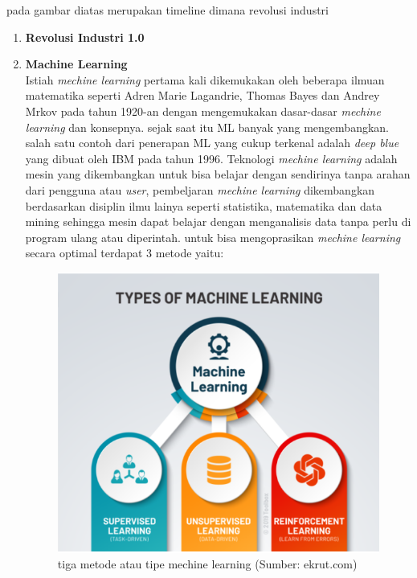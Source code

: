 pada gambar diatas merupakan timeline dimana revolusi industri 
\begin{enumerate}
  \item \textbf{Revolusi Industri 1.0} \\
     
  \item \textbf{Machine Learning}  \\
    Istiah \textit{mechine learning}  pertama kali dikemukakan oleh beberapa ilmuan matematika seperti Adren Marie Lagandrie, Thomas Bayes dan Andrey Mrkov pada tahun 1920-an dengan mengemukakan dasar-dasar \textit{mechine learning} dan konsepnya. sejak saat itu ML banyak yang mengembangkan. salah satu contoh dari penerapan ML yang cukup terkenal adalah \textit{deep blue} yang dibuat oleh IBM pada tahun 1996.
    Teknologi \textit{mechine learning}  adalah mesin yang dikembangkan untuk bisa belajar dengan sendirinya tanpa arahan dari pengguna atau \textit{user}, pembeljaran \textit{mechine learning}  dikembangkan berdasarkan disiplin ilmu lainya seperti statistika, matematika dan data mining sehingga mesin dapat belajar dengan menganalisis data tanpa perlu di program ulang atau diperintah.
    untuk bisa mengoprasikan \textit{mechine learning} secara optimal terdapat 3 metode yaitu: 
    \begin{figure} [ht] \centering
      \includegraphics[scale=0.9]{gambar/metode_ML.png}
      \caption{tiga metode atau tipe mechine learning (Sumber: ekrut.com)}

\end{figure}
\end{enumerate}
